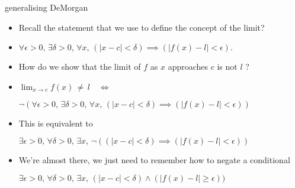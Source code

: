 \documentclass[landscape]{beamer}
\begin{document}
\begin{frame}{generalising DeMorgan}
\begin{itemize}
\item Recall the statement that we use to define the concept of the limit? \pause
\item \rule[-6pt]{0pt}{24pt} $ \forall \epsilon>0, \, \exists \delta>0, \, \forall x, \, (|x-c| < \delta) \implies (|f(x)-l| < \epsilon). $ \pause
\item How do we show that the limit of $f$ as $x$ approaches $c$ is not $l$ ? \pause
\item \rule[-6pt]{0pt}{24pt} $ \lim_{x\rightarrow c} f(x) \, \neq \, l \quad \iff $ \pause
\rule[-6pt]{0pt}{24pt} $ \lnot ( \forall \epsilon>0, \, \exists \delta>0, \, \forall x, \, (|x-c| < \delta) \implies (|f(x)-l| < \epsilon) )$ \pause
\item This is equivalent to \newline
\rule[-6pt]{0pt}{24pt} $ \exists \epsilon>0, \, \forall \delta>0, \, \exists x, \,  \lnot ( (|x-c| < \delta) \implies (|f(x)-l| < \epsilon) )$ \pause
\item We're almost there, we just need to remember how to negate a conditional\textellipsis \pause \newline
\rule[-6pt]{0pt}{24pt} $ \exists \epsilon>0, \, \forall \delta>0, \, \exists x, \,   (|x-c| < \delta ) \land (|f(x)-l| \geq \epsilon) )$
\end{itemize}
\end{frame}
\end{document}
